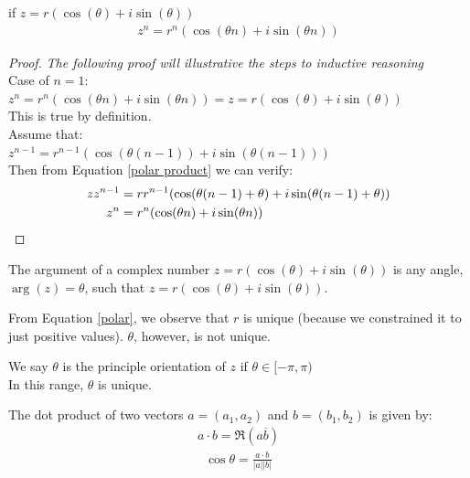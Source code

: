 \begin{theorem}
    if $z = r(\cos(\theta) + i\sin(\theta))$
    \begin{align}
        z^n = r^n(\cos(\theta n) + i\sin(\theta n)) \label{Moivre}
    \end{align}
\end{theorem}

\begin{proof}
    \textit{The following proof will illustrative the steps to inductive reasoning}\\
    Case of $n = 1$: $z^n = r^n(\cos(\theta n) + i\sin(\theta n)) = z = r(\cos(\theta) + i\sin(\theta))$ \\
    This is true by definition. \\
    Assume that: \\
    $z^{n-1} = r^{n-1}(\cos(\theta (n-1)) + i\sin(\theta (n-1)))$ \\
    Then from Equation \eqref{polar product} we can verify: \\
    \begin{align}
        zz^{n-1} & = rr^{n-1}(\cos(\theta (n-1) + \theta) + i\sin(\theta (n-1) + \theta)) \notag \\
        z^{n}    & = r^{n}(\cos(\theta n) + i\sin(\theta n)) \notag
    \end{align}
\end{proof}

\begin{definition}
    [Argument]
    The argument of a complex number $z = r(\cos(\theta) + i\sin(\theta))$ is any angle, $\arg(z) = \theta$, such that $z = r(\cos(\theta) + i\sin(\theta))$.
\end{definition}

From Equation \eqref{polar}, we observe that $r$ is unique (because we constrained it to just positive values). $\theta$, however, is not unique.

\begin{definition}
    We say $\theta$ is the principle orientation of $z$ if $\theta \in [-\pi, \pi)$ \\
    In this range, $\theta$ is unique.
\end{definition}

\begin{definition}
     The dot product of two vectors $a = (a_1, a_2)$ and $b = (b_1, b_2)$ is given by:
    \begin{align}
        a \cdot b  = \Re(a\overline{b})
        \label{dot product}
    \end{align}
    \begin{align}
        \cos \theta = \frac{a \cdot b}{|a||b|}
    \end{align}
\end{definition}

